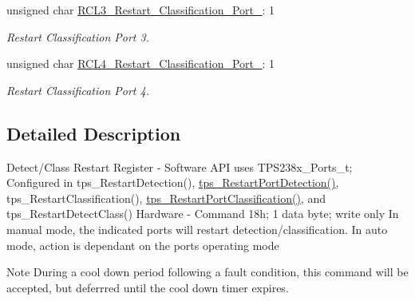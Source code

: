 \begin{DoxyCompactItemize}
unsigned char \hyperlink{struct_t_p_s238x___detect___class___restart___register__t_a89a38687600402ad01745dd4d1c5cf53}{R\-C\-L3\-\_\-\-Restart\-\_\-\-Classification\-\_\-\-Port\-\_}\-: 1
\begin{DoxyCompactList}\small\item\em Restart Classification Port 3. \end{DoxyCompactList}\item 
unsigned char \hyperlink{struct_t_p_s238x___detect___class___restart___register__t_ae5bc0d4dbf6d98b1a65ab37d7d595d47}{R\-C\-L4\-\_\-\-Restart\-\_\-\-Classification\-\_\-\-Port\-\_}\-: 1
\begin{DoxyCompactList}\small\item\em Restart Classification Port 4. \end{DoxyCompactList}\end{DoxyCompactItemize}


\subsection{Detailed Description}
Detect/\-Class Restart Register -\/ Software A\-P\-I uses T\-P\-S238x\-\_\-\-Ports\-\_\-t; Configured in tps\-\_\-\-Restart\-Detection(), \hyperlink{_t_p_s23861_8c_a840d271905d539b9c28fb4bbcc10313e}{tps\-\_\-\-Restart\-Port\-Detection()}, tps\-\_\-\-Restart\-Classification(), \hyperlink{_t_p_s23861_8c_abee472a6cce083fa8990b8ac57b8d58f}{tps\-\_\-\-Restart\-Port\-Classification()}, and tps\-\_\-\-Restart\-Detect\-Class() Hardware -\/ Command 18h; 1 data byte; write only In manual mode, the indicated ports will restart detection/classification. In auto mode, action is dependant on the ports operating mode \begin{DoxyNote}{Note}
During a cool down period following a fault condition, this command will be accepted, but deferrred until the cool down timer expires. 
\end{DoxyNote}


